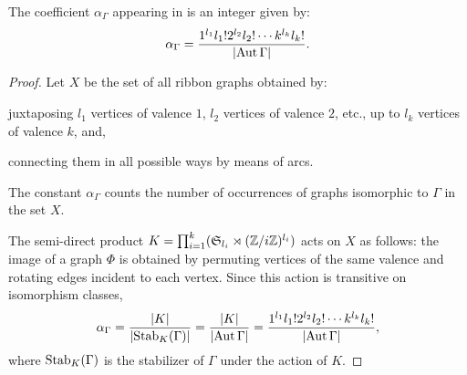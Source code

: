 \begin{lemma}\label{thm:feynman-avg-coeff}
  The coefficient \(\alpha_\Gamma\) appearing in
   is an integer given by:
  \begin{equation*}
    \alpha_\Gamma =
    \frac{1^{l_1} l_1! 2^{l_2} l_2! \cdots k^{l_k} l_k!}
    {\lvert\operatorname{Aut}\Gamma\rvert}.
  \end{equation*}
\end{lemma}
\begin{proof}
  Let \(X\) be the set of all ribbon graphs obtained by:
  \begin{inparaenum}
  \item juxtaposing \(l_1\) vertices of valence \(1\), \(l_2\)
    vertices of valence \(2\), etc., up to \(l_k\) vertices of valence
    \(k\), and,
  \item connecting them in all possible ways by means of arcs.
  \end{inparaenum}
  The constant \(\alpha_\Gamma\) counts the number of occurrences of graphs
  isomorphic to \(\Gamma\) in the set \(X\).
  
  The semi-direct product \(K = \prod_{i=1}^k(\mathfrak{S}_{l_i} \rtimes
(\mathbb{Z}/i\mathbb{Z})^{l_i})\)
  acts on \(X\) as follows: the image of a graph
  \(\Phi\) is obtained by permuting vertices of the same valence and
  rotating edges incident to each vertex. Since this action is
  transitive on isomorphism classes,
  \begin{equation*}
    \alpha_\Gamma = \frac {\lvert K\rvert} {\lvert\textrm{Stab}_K(\Gamma)\rvert}
    = \frac {\lvert K\rvert} {\lvert\operatorname{Aut}\Gamma\rvert}
    = \frac{1^{l_1} l_1! 2^{l_2} l_2! \cdots
      k^{l_k} l_k!}{\lvert\operatorname{Aut}\Gamma\rvert},
  \end{equation*}
  where $\textrm{Stab}_K(\Gamma)$ is the stabilizer of $\Gamma$ under the
  action of $K$.
\end{proof}

